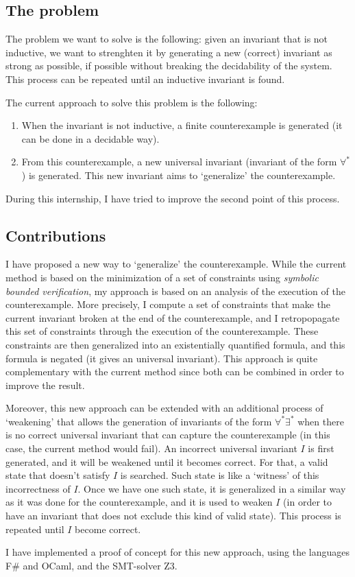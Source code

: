 \documentclass{article}
\newenvironment{point}[1]%
{\subsection*{#1}}%
{}
\begin{document}
\begin{point}{The problem}
  
  The problem we want to solve is the following:
  given an invariant that is not inductive, we want to strenghten it by generating a new (correct) invariant as strong as possible,
  if possible without breaking the decidability of the system.
  This process can be repeated until an inductive invariant is found.

  The current approach to solve this problem is the following:
  \begin{enumerate}
    \item When the invariant is not inductive, a finite counterexample is generated (it can be done in a decidable way).
    \item From this counterexample, a new universal invariant (invariant of the form \(\forall^*\)) is generated. This new invariant aims to `generalize' the counterexample.
  \end{enumerate}
  
  During this internship, I have tried to improve the second point of this process.

\end{point}

\begin{point}{Contributions}

  I have proposed a new way to `generalize' the counterexample. While the current method is based on the
  minimization of a set of constraints using \textit{symbolic bounded verification},
  my approach is based on an analysis of the execution of the counterexample.
  More precisely, I compute a set of constraints that make the current invariant broken at the end of the counterexample,
  and I retropopagate this set of constraints through the execution of the counterexample.
  These constraints are then generalized into an existentially quantified formula, and this formula is negated
  (it gives an universal invariant).
  This approach is quite complementary with the current method since both can be combined in order to improve the result.

  Moreover, this new approach can be extended with an additional process of `weakening' that
  allows the generation of invariants of the form \(\forall^*\exists^*\) when there is no
  correct universal invariant that can capture the counterexample (in this case, the current method would fail).
  An incorrect universal invariant \(I\) is first generated, and it will be weakened until it becomes correct.
  For that, a valid state that doesn't satisfy \(I\) is searched.
  Such state is like a `witness' of this incorrectness of \(I\). Once we have one such state,
  it is generalized in a similar way as it was done for the counterexample, and it is used to weaken \(I\)
  (in order to have an invariant that does not exclude this kind of valid state).
  This process is repeated until \(I\) become correct.

  I have implemented a proof of concept for this new approach, using the languages F\# and OCaml, and the SMT-solver Z3.
 
\end{point}
\end{document}
